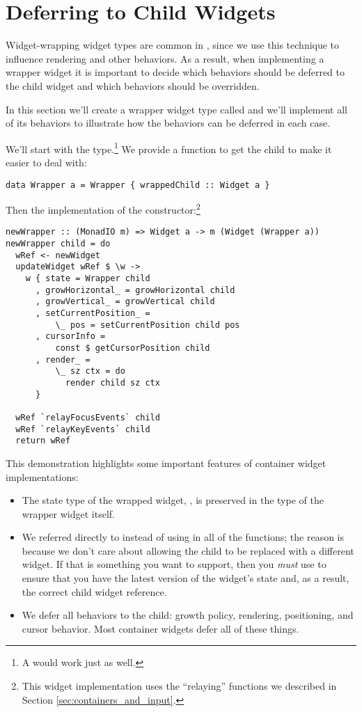\section{Deferring to Child Widgets}

Widget-wrapping widget types are common in , since we use
this technique to influence rendering and other behaviors.  As a
result, when implementing a wrapper widget it is important to decide
which behaviors should be deferred to the child widget and which
behaviors should be overridden.

In this section we'll create a wrapper widget type called 
and we'll implement all of its behaviors to illustrate how the
behaviors can be deferred in each case.

We'll start with the type.\footnote{A  would work just as
  well.}  We provide a function to get the child to make it easier to
deal with:

\begin{verbatim}
data Wrapper a = Wrapper { wrappedChild :: Widget a }
\end{verbatim}

Then the implementation of the constructor:\footnote{This widget
  implementation uses the ``relaying'' functions we described in
  Section \ref{sec:containers_and_input}.}

\begin{verbatim}
newWrapper :: (MonadIO m) => Widget a -> m (Widget (Wrapper a))
newWrapper child = do
  wRef <- newWidget
  updateWidget wRef $ \w ->
    w { state = Wrapper child
      , growHorizontal_ = growHorizontal child
      , growVertical_ = growVertical child
      , setCurrentPosition_ =
          \_ pos = setCurrentPosition child pos
      , cursorInfo =
          const $ getCursorPosition child
      , render_ =
          \_ sz ctx = do
            render child sz ctx
      }

  wRef `relayFocusEvents` child
  wRef `relayKeyEvents` child
  return wRef
\end{verbatim}

This demonstration highlights some important features of container
widget implementations:

\begin{itemize}
\item The state type of the wrapped widget, , is preserved in
  the type of the wrapper widget itself.
\item We referred directly to  instead of using
   in all of the functions; the reason is because we
  don't care about allowing the child to be replaced with a different
  widget.  If that is something you want to support, then you
  \textit{must} use  to ensure that you have the latest
  version of the widget's state and, as a result, the correct child
  widget reference.
\item We defer all behaviors to the child: growth policy, rendering,
  positioning, and cursor behavior.  Most container widgets defer all
  of these things.
\end{itemize}

